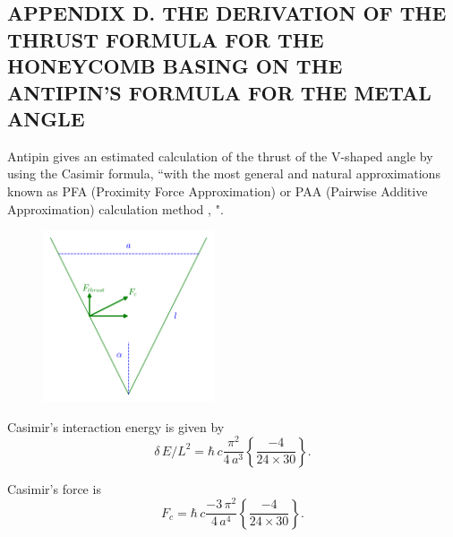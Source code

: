 \documentclass[twoside, 10pt, ptm]{article}
\def\myvspacebeforesubsection{-2.0mm}
\def\myvspaceaftersubsection{-2.5mm}
\begin{document}
\begin{multicols}{2}

\vspace{\myvspacebeforesubsection}
    \subsection*{\centering\uppercase{Appendix D. The derivation of the thrust formula for the
honeycomb basing on the Antipin's formula for the metal
angle}}\label{appendix-d.-the-derivation-of-the-thrust-formula-for-the-honeycomb-basing-on-the-antipin-formula-for-the-thrust-of-a-metal-angle}
\vspace{\myvspaceaftersubsection}

\setcounter{equation}{0}
\renewcommand{\theequation}{D.\arabic{equation}}

    Antipin \cite{Antipin2012} gives an estimated calculation of the thrust
of the  \mbox{V-shaped} angle by using the Casimir formula, ``with the most
general and natural approximations known as PFA (Proximity Force
Approximation) or PAA (Pairwise Additive Approximation) calculation
method \cite{Intravaia2013}, \cite{Rodriguez2011}".

\begin{figure}
\begin{center}
\includegraphics[width=0.45\textwidth]{Antipins_angle_en.png}
\caption{}{}
\end{center}
\label{fig:Antipins_angle}
\end{figure}


Casimir's interaction energy is given by
\noindent
\begin{equation}\delta\,E/L^2 = \hbar\,c\frac{\pi^2}{4\,a^3}\left\{\frac{-4}{24\times30}\right\}.\end{equation}

Casimir's force is
\noindent
\begin{equation}F_{c} = \hbar\,c\frac{-3\,\pi^2}{4\,a^4}\left\{\frac{-4}{24\times30}\right\}.\end{equation}


\end{multicols}
\end{document}
